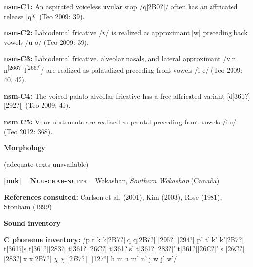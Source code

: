\begin{styleBody}
\textbf{nsm-C1:} An aspirated voiceless uvular stop /q[2B0?]/ often has an affricated release [q\textsuperscript{$\chi $}] (Teo 2009: 39).
\end{styleBody}

\begin{styleBody}
\textbf{nsm-C2:} Labiodental fricative /v/ is realized as approximant [w] preceding back vowels /u o/ (Teo 2009: 39).
\end{styleBody}

\begin{styleBody}
\textbf{nsm-C3:} Labiodental fricative, alveolar nasals, and lateral approximant /v n n\textsuperscript{[266?] }l\textsuperscript{[266?]}/ are realized as palatalized preceding front vowels /i e/ (Teo 2009: 40, 42).
\end{styleBody}

\begin{styleBody}
\textbf{nsm-C4:} The voiced palato-alveolar fricative has a free affricated variant [d[361?][292?]] (Teo 2009: 40).
\end{styleBody}

\begin{styleBody}
\textbf{nsm-C5:} Velar obstruents are realized as palatal preceding front vowels /i e/ (Teo 2012: 368).
\end{styleBody}

\begin{styleBody}
\textbf{Morphology}
\end{styleBody}

\begin{styleBody}
(adequate texts unavailable)
\end{styleBody}

\clearpage\begin{styleBody}
\textbf{[nuk] }\ \ \textbf{\textsc{Nuu-chah-nulth}}\textbf{\ \ }Wakashan, \textit{Southern Wakashan} (Canada)
\end{styleBody}

\begin{styleBody}
\textbf{References consulted: }Carlson et al. (2001), Kim (2003), Rose (1981), Stonham (1999)
\end{styleBody}

\begin{styleBody}
\textbf{Sound inventory}
\end{styleBody}

\begin{styleBody}
\textbf{C phoneme inventory:} /p t k k[2B7?] q q[2B7?] [295?] [294?] p’ t’ k’ k’[2B7?] t[361?]s t[361?][283?] t[361?][26C?] t[361?]s’ t[361?][283?]’ t[361?][26C?]’ s [26C?] [283?] x x[2B7?] $\chi $ $\chi [2B7?]$ [127?] h m n m’ n’ j w j’ w’/
\end{styleBody}

